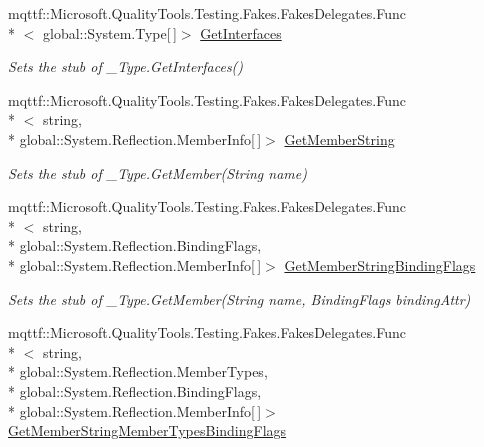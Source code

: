 \begin{DoxyCompactItemize}
mqttf\-::\-Microsoft.\-Quality\-Tools.\-Testing.\-Fakes.\-Fakes\-Delegates.\-Func\\*
$<$ global\-::\-System.\-Type\mbox{[}$\,$\mbox{]}$>$ \hyperlink{class_system_1_1_runtime_1_1_interop_services_1_1_fakes_1_1_stub___type_a35afaa945439b85833a19fbd2c0b2f8d}{Get\-Interfaces}
\begin{DoxyCompactList}\small\item\em Sets the stub of \-\_\-\-Type.\-Get\-Interfaces()\end{DoxyCompactList}\item 
mqttf\-::\-Microsoft.\-Quality\-Tools.\-Testing.\-Fakes.\-Fakes\-Delegates.\-Func\\*
$<$ string, \\*
global\-::\-System.\-Reflection.\-Member\-Info\mbox{[}$\,$\mbox{]}$>$ \hyperlink{class_system_1_1_runtime_1_1_interop_services_1_1_fakes_1_1_stub___type_a790f8b87ca88385e3da33e19883bba72}{Get\-Member\-String}
\begin{DoxyCompactList}\small\item\em Sets the stub of \-\_\-\-Type.\-Get\-Member(\-String name)\end{DoxyCompactList}\item 
mqttf\-::\-Microsoft.\-Quality\-Tools.\-Testing.\-Fakes.\-Fakes\-Delegates.\-Func\\*
$<$ string, \\*
global\-::\-System.\-Reflection.\-Binding\-Flags, \\*
global\-::\-System.\-Reflection.\-Member\-Info\mbox{[}$\,$\mbox{]}$>$ \hyperlink{class_system_1_1_runtime_1_1_interop_services_1_1_fakes_1_1_stub___type_a86f03b4cbd0ffbf00f373cf184fc3d43}{Get\-Member\-String\-Binding\-Flags}
\begin{DoxyCompactList}\small\item\em Sets the stub of \-\_\-\-Type.\-Get\-Member(\-String name, Binding\-Flags binding\-Attr)\end{DoxyCompactList}\item 
mqttf\-::\-Microsoft.\-Quality\-Tools.\-Testing.\-Fakes.\-Fakes\-Delegates.\-Func\\*
$<$ string, \\*
global\-::\-System.\-Reflection.\-Member\-Types, \\*
global\-::\-System.\-Reflection.\-Binding\-Flags, \\*
global\-::\-System.\-Reflection.\-Member\-Info\mbox{[}$\,$\mbox{]}$>$ \hyperlink{class_system_1_1_runtime_1_1_interop_services_1_1_fakes_1_1_stub___type_a0af3473c152c0b59ac08f108e647ad53}{Get\-Member\-String\-Member\-Types\-Binding\-Flags}

\end{DoxyCompactItemize}
